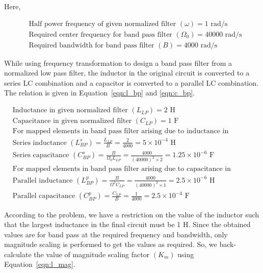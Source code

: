 \documentclass{lab_sheet}
\begin{document}
Here,
\begin{fleqn}[\parindent]
   \begin{equation*}
      \begin{split}
         &\text{Half power frequency of given normalized filter } (\omega)=1 \text{ rad/s}\\
         &\text{Required center frequency for band pass filter }(\Omega_0)=40000 \text{ rad/s} \\
         &\text{Required bandwidth for band pass filter }(B)=4000 \text{ rad/s} 
         \end{split}
      \end{equation*}
\end{fleqn}
While using frequency transformation to design a band pass filter from a normalized low pass filter, the inductor in the original circuit is converted to a series LC combination and a capacitor is converted to a parallel LC combination. The relation is given in Equation~\ref{eqn:l_bp} and \ref{eqn:c_bp}.
\begin{fleqn}[\parindent]
   \begin{equation*}
      \begin{split}
         &\text{Inductance in given normalized filter } (L_{LP})=2 \text{ H}\\
         &\text{Capacitance in given normalized filter } (C_{LP})=1 \text{ F}\\
         &\text{For mapped elements in band pass filter arising due to inductance in normalized filter:}\\
         &\text{Series inductance }(L_{BP}^s)=\frac{L_{LP}}{B}=\frac{2}{4000}=5\times10^{-4} \text{ H}\\
         &\text{Series capacitance }(C_{BP}^s)=\frac{B}{\Omega_0L_{LP}}=\frac{4000}{(40000)^2\times2}=1.25\times10^{-6}\text{ F}\\
         &\text{For mapped elements in band pass filter arising due to capacitance in normalized filter:}\\
         &\text{Parallel inductance }(L_{BP}^p)=\frac{B}{\Omega^2C_{LP}}=\frac{4000}{(40000)^2\times1}=2.5\times10^{-6} \text{ H}\\
         &\text{Parallel capacitance }(C_{BP}^p)=\frac{C_{LP}}{B}=\frac{1}{4000}=2.5\times10^{-4} \text{ F}
         \end{split}
      \end{equation*}
\end{fleqn}

According to the problem, we have a restriction on the value of the inductor such that the largest inductance in the final circuit must be 1 H. Since the obtained values are for band pass at the required frequency and bandwidth, only magnitude scaling is performed to get the values as required. So, we back-calculate the value of magnitude scaling factor $(K_m)$ using Equation~\ref{eqn:l_mag}.
\end{document}
